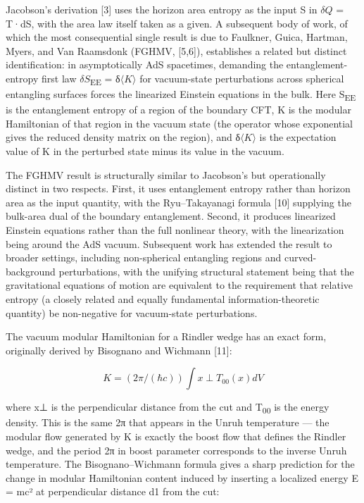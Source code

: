\documentclass[11pt]{article}
\begin{document}
Jacobson's derivation [3] uses the horizon area entropy as the input
S in $\delta Q$ = T·dS, with the area law itself taken as a given. A subsequent
body of work, of which the most consequential single result is due to
Faulkner, Guica, Hartman, Myers, and Van Raamsdonk (FGHMV, [5,6]),
establishes a related but distinct identification: in asymptotically AdS
spacetimes, demanding the entanglement-entropy first law $\delta S$\textsubscript{EE} = δ$\langle K\rangle$
for vacuum-state perturbations across spherical entangling surfaces
forces the linearized Einstein equations in the bulk. Here S\textsubscript{EE} is the
entanglement entropy of a region of the boundary CFT, K is the modular
Hamiltonian of that region in the vacuum state (the operator whose
exponential gives the reduced density matrix on the region), and δ$\langle K\rangle$ is
the expectation value of K in the perturbed state minus its value in the
vacuum.

The FGHMV result is structurally similar to Jacobson's but
operationally distinct in two respects. First, it uses entanglement
entropy rather than horizon area as the input quantity, with the
Ryu--Takayanagi formula [10] supplying the bulk-area dual of the
boundary entanglement. Second, it produces linearized Einstein equations
rather than the full nonlinear theory, with the linearization being
around the AdS vacuum. Subsequent work has extended the result to
broader settings, including non-spherical entangling regions and
curved-background perturbations, with the unifying structural statement
being that the gravitational equations of motion are equivalent to the
requirement that relative entropy (a closely related and equally
fundamental information-theoretic quantity) be non-negative for
vacuum-state perturbations.

The vacuum modular Hamiltonian for a Rindler wedge has an exact form,
originally derived by Bisognano and Wichmann [11]:

\[ K = (2π/(ℏc)) \int  x{\perp} T_{00}(x) dV \]

where x⊥ is the perpendicular distance from the cut and T\textsubscript{00} is the
energy density. This is the same 2π that appears in the Unruh
temperature --- the modular flow generated by K is exactly the boost
flow that defines the Rindler wedge, and the period 2π in boost
parameter corresponds to the inverse Unruh temperature. The
Bisognano--Wichmann formula gives a sharp prediction for the change in
modular Hamiltonian content induced by inserting a localized energy E =
mc² at perpendicular distance d1 from the cut:
\end{document}
